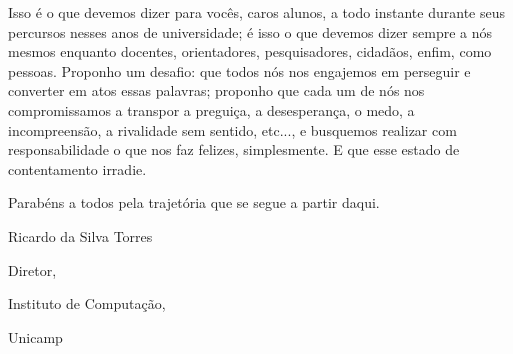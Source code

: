 Isso é o que devemos dizer para vocês, caros alunos, a todo instante durante
seus percursos nesses anos de universidade; é isso o que devemos dizer sempre a
nós mesmos enquanto docentes, orientadores, pesquisadores, cidadãos, enfim, como
pessoas. Proponho um desafio: que todos nós nos engajemos em perseguir e
converter em atos essas palavras; proponho que cada um de nós nos compromissamos
a transpor a preguiça, a desesperança, o medo, a incompreensão, a rivalidade sem
sentido, etc..., e busquemos realizar com responsabilidade o que nos faz
felizes, simplesmente. E que esse estado de contentamento irradie.

Parabéns a todos pela trajetória que se segue a partir daqui.

Ricardo da Silva Torres

Diretor,

Instituto de Computação,

Unicamp